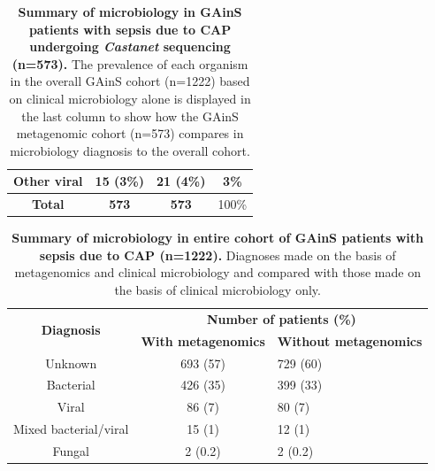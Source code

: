 \begin{table}[]
\begin{center}
\begin{tabular}{|c|c|c|c|}
Other viral            & 15 (3\%)                                                                  & 21 (4\%)                                                                             & 3\%                                                                                    \\ \hline
\textbf{Total}         & \textbf{573}                                                              & \textbf{573}                                                                         & 100\%                                                                                  \\ \hline
\end{tabular}
\end{center}
\smallskip
\caption[Summary of microbiology in GAinS patients undergoing \textit{Castanet} sequencing]{\textbf{Summary of microbiology in GAinS patients with sepsis due to CAP undergoing \textit{Castanet} sequencing (n=573).} The prevalence of each organism in the overall GAinS cohort (n=1222) based on clinical microbiology alone is displayed in the last column to show how the GAinS metagenomic cohort (n=573) compares in microbiology diagnosis to the overall cohort.} 
\label{tab:gains-summary-castanet}
\end{table}

\begin{table}[]
\begin{center}
\begin{tabular}{|c|c|l|}
\hline
\multirow{2}{*}{\textbf{Diagnosis}} & \multicolumn{2}{c|}{\textbf{Number of patients (\%)}}      \\ \cline{2-3} 
                                    & \textbf{With metagenomics} & \textbf{Without metagenomics} \\ \hline
Unknown                             & 693 (57)                   & 729 (60)                      \\ \hline
Bacterial                           & 426 (35)                   & 399 (33)                      \\ \hline
Viral                               & 86 (7)                     & 80 (7)                        \\ \hline
Mixed bacterial/viral               & 15 (1)                     & 12 (1)                        \\ \hline
Fungal                              & 2 (0.2)                    & 2 (0.2)                       \\ \hline
\end{tabular}
\end{center}
\smallskip
\caption[Summary of microbiology in entire cohort of GAinS patients with sepsis due to CAP] {\textbf{Summary of microbiology in entire cohort of GAinS patients with sepsis due to CAP (n=1222).} Diagnoses made on the basis of metagenomics and clinical microbiology and compared with those made on the basis of clinical microbiology only.}
\label{tab:gains-summary}
\end{table}
\FloatBarrier


